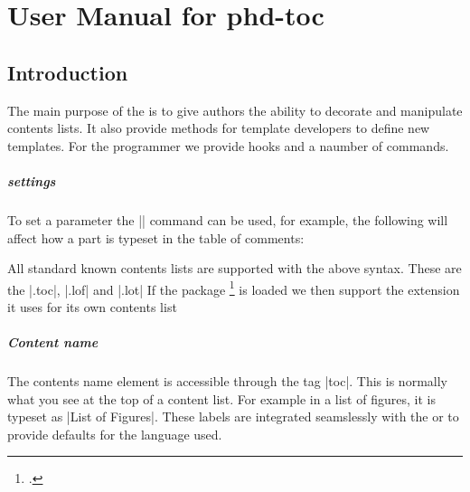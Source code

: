 \chapter{User Manual for phd-toc}
\label{ch:toc}




\section{Introduction}

The main purpose of the  is to give authors the ability to decorate and manipulate  contents lists. It also
provide methods for template developers to define new templates. For the programmer we provide hooks and a
naumber of commands.

\paragraph{settings} To set a parameter the |\cxset| command can be used, for example, the following will affect how a part is typeset in the table of comments:

\begin{teX}
\end{teX}

All standard \latexe known contents lists are supported with the above syntax. These are the |.toc|, |.lof| and |.lot|
If the package \footcite{listings} is loaded we then support the extension it uses for its own contents list

\paragraph{Content name} The contents name element is accessible through the tag |toc|. This is normally what you see at the top of a content list. For example in a list of figures, it is typeset as |List of Figures|. These labels are integrated seamslessly with the  or  to provide defaults for the language used. 

